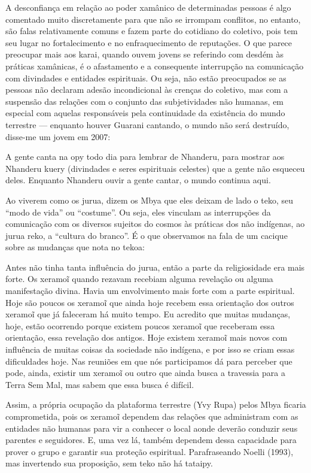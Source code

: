 A desconfiança em relação ao poder xamânico de determinadas pessoas é
algo comentado muito discretamente para que não se irrompam conflitos,
no entanto, são falas relativamente comuns e fazem parte do cotidiano
do coletivo, pois tem seu lugar no fortalecimento e no enfraquecimento
de reputações. O que parece preocupar mais aos karai, quando ouvem
jovens se referindo com desdém às práticas xamânicas, é o afastamento e
a consequente interrupção na comunicação com divindades e entidades
espirituais. Ou seja, não estão preocupados se as pessoas não declaram
adesão incondicional às crenças do coletivo, mas com a suspensão das
relações com o conjunto das subjetividades não humanas, em especial com
aquelas responsáveis pela continuidade da existência do mundo terrestre
— enquanto houver Guarani cantando, o mundo não será destruído,
disse-me um jovem em 2007: 

A gente canta na opy todo dia para lembrar de Nhanderu, para mostrar aos
Nhanderu kuery (divindades e seres espirituais celestes) que a gente
não esqueceu deles. Enquanto Nhanderu ouvir a gente cantar, o mundo
continua aqui.

Ao viverem como os jurua, dizem os Mbya que eles deixam de lado o teko,
seu ``modo de vida'' ou ``costume''. Ou seja, eles vinculam as interrupções
da comunicação com os diversos sujeitos do cosmos às práticas dos não
indígenas, ao jurua reko, a ``cultura do branco''. É o que observamos na
fala de um cacique sobre as mudanças que nota no tekoa:

Antes não tinha tanta influência do jurua, então a parte da
religiosidade era mais forte. Os xeramo\~{i} quando
rezavam recebiam alguma revelação ou alguma manifestação divina. Havia
um envolvimento mais forte com a parte espiritual. Hoje são poucos os
xeramo\~{i} que ainda hoje recebem essa orientação
dos outros xeramo\~{i} que já faleceram há muito
tempo. Eu acredito que muitas mudanças, hoje, estão ocorrendo porque
existem poucos xeramo\~{i} que receberam essa
orientação, essa revelação dos antigos. Hoje existem
xeramo\~{i} mais novos com influência de muitas
coisas da sociedade não indígena, e por isso se criam essas
dificuldades hoje. Nas reuniões em que nós participamos dá para perceber
que pode, ainda, existir um xeramo\~{i} ou outro que
ainda busca a travessia para a Terra Sem Mal, mas sabem que essa busca
é difícil. 

Assim, a própria ocupação da plataforma terrestre (Yvy Rupa) pelos Mbya
ficaria comprometida, pois os xeramo\~{i} dependem
das relações que administram com as entidades não humanas para vir a
conhecer o local aonde deverão conduzir seus parentes e seguidores. E,
uma vez lá, também dependem dessa capacidade para prover o grupo e
garantir sua proteção espiritual. Parafraseando Noelli (1993), mas
invertendo sua proposição, sem teko não há tataipy.

